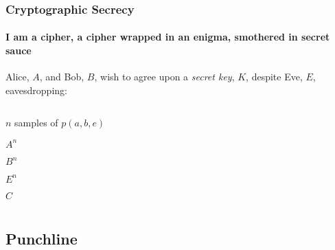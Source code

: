 \documentclass[final,serif,aspectratio=1610]{beamer}
\begin{document}
\begin{frame}
  \frametitle{Cryptographic Secrecy~\cite{maurer1993secret}}
  \framesubtitle{I am a cipher, a cipher wrapped in an enigma, smothered in secret sauce}
  \large
  Alice, $A$, and Bob, $B$, wish to agree upon a \emph{secret key}, $K$, despite Eve, $E$, eavesdropping:

  \vspace{1cm}

  \begin{columns}[t]
    \begin{column}{0.5\textwidth}
      \begin{description}[Communication:]
        \item[given:] $n$ samples of $p(a, b, e)$
        \item[Alice receives:] $A^n$
        \item[Bob receives:] $B^n$
        \item[Eve receives:] $E^n$
        \item[Communication:] $C$
      \end{description}
    \end{column}
    \begin{column}{0.5\textwidth}
    \end{column}
  \end{columns}
\end{frame}

\subsection{Punchline}
\end{document}
